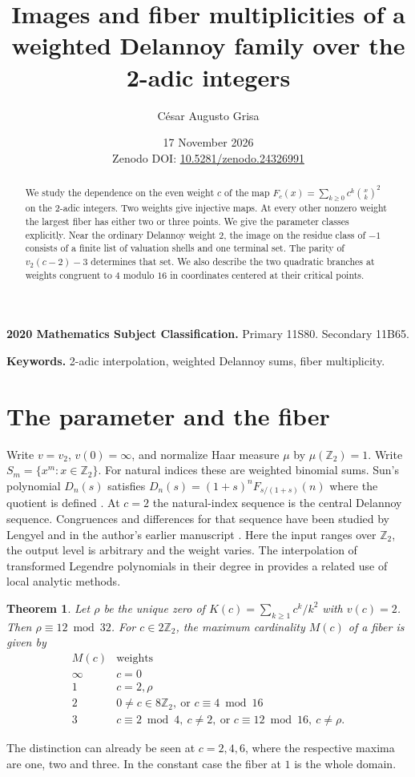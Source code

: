 \documentclass[11pt]{article}
\title{Images and fiber multiplicities of a weighted Delannoy family over the 2-adic integers}
\author{C\'esar Augusto Grisa}
\date{17 November 2026\\[0.4em]{\small Zenodo DOI: \href{https://doi.org/10.5281/zenodo.24326991}{10.5281/zenodo.24326991}}}
\newtheorem{theorem}{Theorem}
\newcommand{\Z}{\mathbb Z_2}
\begin{document}
\maketitle
\begin{abstract}
We study the dependence on the even weight $c$ of the map
$F_c(x)=\sum_{k\ge0}c^k\binom{x}{k}^2$ on the 2-adic integers.
Two weights give injective maps. At every other nonzero weight the largest fiber has either two or three points. We give the parameter classes explicitly. Near the ordinary Delannoy weight $2$, the image on the residue class of $-1$ consists of a finite list of valuation shells and one terminal set. The parity of $v_2(c-2)-3$ determines that set. We also describe the two quadratic branches at weights congruent to $4$ modulo $16$ in coordinates centered at their critical points.
\end{abstract}

\noindent\textbf{2020 Mathematics Subject Classification.} Primary 11S80. Secondary 11B65.
\par\noindent\textbf{Keywords.} 2-adic interpolation, weighted Delannoy sums, fiber multiplicity.

\section{The parameter and the fiber}
Write $v=v_2$, $v(0)=\infty$, and normalize Haar measure $\mu$ by $\mu(\Z)=1$. Write $S_m=\{x^m:x\in\Z\}$. For natural indices these are weighted binomial sums. Sun's polynomial $D_n(s)$ satisfies $D_n(s)=(1+s)^n F_{s/(1+s)}(n)$ where the quotient is defined \cite{sun}. At $c=2$ the natural-index sequence is the central Delannoy sequence. Congruences and differences for that sequence have been studied by Lengyel and in the author's earlier manuscript \cite{lengyel,grisa}. Here the input ranges over $\Z$, the output level is arbitrary and the weight varies. The interpolation of transformed Legendre polynomials in their degree in \cite{km} provides a related use of local analytic methods.
\begin{theorem}
Let $\rho$ be the unique zero of $K(c)=\sum_{k\ge1}c^k/k^2$ with $v(c)=2$. Then $\rho\equiv12\bmod32$. For $c\in2\Z$, the maximum cardinality $M(c)$ of a fiber is given by
\[
\begin{array}{c|l}
M(c)&\text{weights}\\\hline
\infty& c=0\\
1 & c=2,\rho\\
2 & 0\ne c\in8\Z,\ \text{or }c\equiv4\bmod16\\
3 & c\equiv2\bmod4,\ c\ne2,\ \text{or } c\equiv12\bmod16,\ c\ne\rho .
\end{array}
\]
\end{theorem}
The distinction can already be seen at $c=2,4,6$, where the respective maxima are one, two and three. In the constant case the fiber at $1$ is the whole domain.
\end{document}
